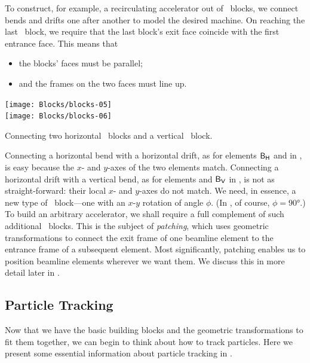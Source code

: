 To construct, for example, a recirculating accelerator out of
\LEGO\ blocks, we connect bends and drifts one after another to
model the desired machine. On reaching the last \LEGO\ block,
we require that the last block's exit face coincide with the
first entrance face. This means that
\begin{itemize}
  \item the blocks' faces must be parallel;
  \item and the frames on the two faces must line up.
\end{itemize}

\begin{marginfigure}[-2.5\baselineskip]
  \texttt{[image: Blocks/blocks-05]}\\
  \noindent\hspace*{.8em}
  \texttt{[image: Blocks/blocks-06]}
  \caption{Connecting two horizontal \LEGO\ blocks and a vertical
           \LEGO\ block.}
  \label{fig:connect.blocks}
\end{marginfigure}

%
Connecting a horizontal bend with a horizontal drift, as for
elements $\text{\textsf{B}}_\text{\textsf{H}}$ and 
in , is easy because the $x$- and $y$-axes
of the two elements match. Connecting a horizontal drift with
a vertical bend, as for elements  and
$\text{\textsf{B}}_\text{\textsf{V}}$ in ,
is not as straight-forward: their local $x$- and $y$-axes do not
match. We need, in essence, a new type of
\LEGO\ block---one with an $x$-$y$ rotation of angle $\phi$. (In
, of course, $\phi=\ang{90}$.) To build an
arbitrary accelerator, we shall require a full complement of such
additional \LEGO\ blocks.%
\cite[15pt]{Forest:1997:DynEuclid}
This is the subject of \emph{patching}, which uses geometric
transformations to connect the exit frame of one beamline element
to the entrance frame of a subsequent element. Most significantly,
patching enables us to position beamline elements wherever we want
them. We discuss this in more detail later in .

\subsection{Particle Tracking}
\label{sec:ptcl.track}

Now that we have the basic building blocks and the geometric
transformations to fit them together, we can begin to think about
how to track particles. Here we present some essential information
about particle tracking in \PTC.

